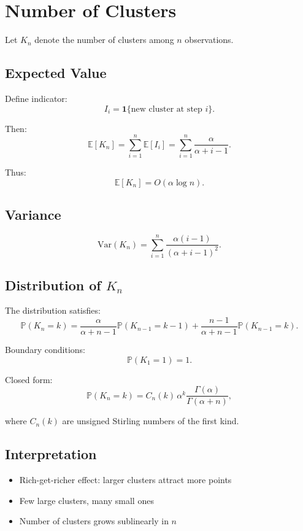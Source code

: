 \documentclass[12pt,oneside]{book}
\numberwithin{equation}{section}
\theoremstyle{definition}
\theoremstyle{plain}
\theoremstyle{remark}
\begin{document}
\section{Number of Clusters}

Let $K_n$ denote the number of clusters among $n$ observations.

\subsection{Expected Value}

Define indicator:
\[
I_i = \mathbf{1}\{\text{new cluster at step } i\}.
\]

Then:
\[
\mathbb{E}[K_n]
=
\sum_{i=1}^n \mathbb{E}[I_i]
=
\sum_{i=1}^n \frac{\alpha}{\alpha+i-1}.
\]

Thus:
\[
\mathbb{E}[K_n] = O(\alpha \log n).
\]

\subsection{Variance}

\[
\mathrm{Var}(K_n)
=
\sum_{i=1}^n
\frac{\alpha(i-1)}{(\alpha+i-1)^2}.
\]

\subsection{Distribution of $K_n$}

The distribution satisfies:
\[
\mathbb{P}(K_n = k)
=
\frac{\alpha}{\alpha+n-1} \mathbb{P}(K_{n-1}=k-1)
+
\frac{n-1}{\alpha+n-1} \mathbb{P}(K_{n-1}=k).
\]

Boundary conditions:
\[
\mathbb{P}(K_1 = 1) = 1.
\]

Closed form:
\[
\mathbb{P}(K_n = k)
=
C_n(k)\,\alpha^k \frac{\Gamma(\alpha)}{\Gamma(\alpha+n)},
\]

where $C_n(k)$ are unsigned Stirling numbers of the first kind.

\subsection{Interpretation}

\begin{itemize}
\item Rich-get-richer effect: larger clusters attract more points
\item Few large clusters, many small ones
\item Number of clusters grows sublinearly in $n$
\end{itemize}
\end{document}
